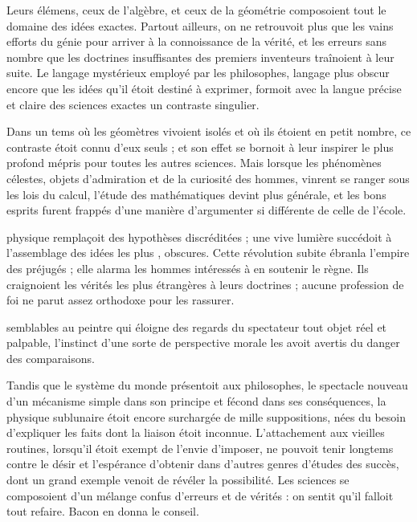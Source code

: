 \documentclass[11pt,a4paper]{article}
\begin{document}
Leurs élémens, ceux de l'algèbre, et ceux de la géométrie composoient
tout le domaine des idées exactes. Partout ailleurs, on ne retrouvoit
plus que les vains efforts du génie pour arriver à la connoissance de la
vérité, et les erreurs sans nombre que les doctrines insuffisantes des
premiers inventeurs traînoient à leur suite. Le langage mystérieux
employé par les philosophes, langage plus obscur encore que les idées
qu'il étoit destiné à exprimer, formoit avec la langue précise et claire
des sciences exactes un contraste singulier.

Dans un tems où les géomètres vivoient isolés et où ils étoient en petit
nombre, ce contraste étoit connu d'eux seuls ; et son effet se bornoit à
leur inspirer le plus profond mépris pour toutes les autres sciences.
Mais lorsque les phénomènes célestes, objets d'admiration et de la
curiosité des hommes, vinrent se ranger sous les lois du calcul, l'étude
des mathématiques devint plus générale,  et les bons esprits furent frappés d'une manière
d'argumenter si différente de celle de l'école.

 physique remplaçoit des hypothèses discréditées ;
une vive lumière succédoit à l'assemblage des idées les plus
, obscures. Cette révolution subite ébranla l'empire des
préjugés ; elle alarma les hommes intéressés à en soutenir le règne. Ils
craignoient les vérités les plus étrangères à leurs doctrines ;
 aucune profession de foi ne parut assez orthodoxe pour les
rassurer.

semblables au peintre qui éloigne des regards du spectateur tout objet
réel et palpable, l'instinct d'une sorte de perspective morale les avoit
avertis du danger des comparaisons.

Tandis que le système du monde présentoit aux philosophes, le spectacle
nouveau d'un mécanisme simple dans son principe et fécond dans ses
conséquences, la physique sublunaire étoit encore surchargée de mille
suppositions, nées du besoin d'expliquer les faits dont la liaison étoit
inconnue. L'attachement aux vieilles routines, lorsqu'il étoit exempt de
 l'envie d'imposer, ne pouvoit tenir longtems
  contre le
désir et l'espérance d'obtenir dans d'autres genres d'études des succès,
dont un grand exemple venoit de révéler la possibilité. Les sciences se composoient d'un
mélange confus d'erreurs et de vérités : on  sentit qu'il
falloit tout refaire. Bacon en donna le conseil.
\end{document}

